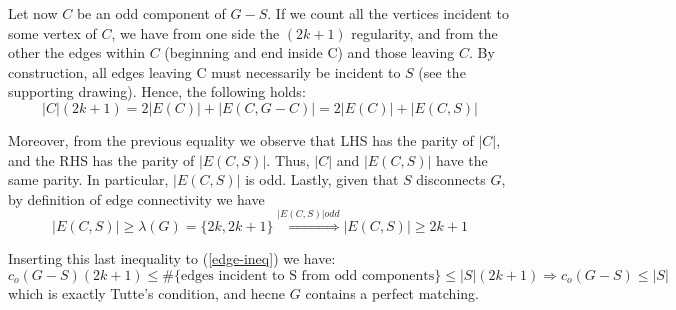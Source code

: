 \documentclass[a4paper, 10pt]{article}
\theoremstyle{definition} %
\begin{document}
Let now $C$ be an odd component of $G - S$. If we count all the vertices incident to some vertex of $C$, we have from one side the $(2k + 1)$ regularity, and from the other the edges within $C$ (beginning and end inside C) and those leaving $C$. By construction, all edges leaving C must necessarily be incident to $S$ (see the supporting drawing). Hence, the following holds:
$$|C|(2k + 1) = 2|E(C)| + |E(C,G-C)| = 2|E(C)| + |E(C,S)|$$

Moreover, from the previous equality we observe that LHS has the parity of $|C|$, and the RHS has the parity of $|E(C,S)|$. Thus, $|C|$ and $|E(C,S)|$ have the same parity. In particular, $|E(C,S)|$ is odd. Lastly, given that $S$ disconnects $G$, by definition of edge connectivity we have
$$|E(C,S)| \geq \lambda(G) = \lbrace 2k, 2k + 1 \rbrace \overset{|E(C,S)| odd}{\Longrightarrow} |E(C,S)| \geq 2k + 1$$

Inserting this last inequality to (\ref{edge-ineq}) we have:
$$c_o(G-S)(2k + 1) \leq \#\lbrace\text{edges incident to S from odd components}\rbrace \leq |S|(2k + 1) \Rightarrow c_o(G-S) \leq |S|$$
which is exactly Tutte's condition, and hecne $G$ contains a perfect matching.
\end{document}
